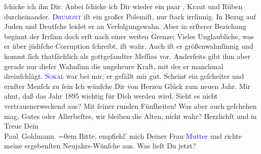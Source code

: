                ſchicke ich ihn Dir. Anbei ſchicke ich Dir wieder ein paar \label{K_mets_Goldmann_94-partII-55v}\label{K_mets_Goldmann_94-partII-55h}, Kraut und Rüben durcheinander. \textsc{\textcolor{blue}{Drumont}{}\ledrightnote{\textcolor{blue}{Édouard Drumont}}} iſt ein großer {\pb}Polemiſt, nur ſtark irrſinnig. In Bezug auf Juden
               und Deutſche leidet er an Verfolgungswahn. Aber in erſterer Beziehung beginnt der
               Irrſinn doch erſt nach einer weiten Grenze; Vieles Unglaubliche, was er über jüdiſche
               Corruption ſchreibt, iſt wahr. Auch iſt er größenwahnſinnig und kommt ſich
               thatſächlich als gottgeſandter Meſſias vor. Anderſeits gibt ihm aber gerade nur
               dieſer Wahnſinn die ungeheure Kraft, mit der er manchmal dreinſchlägt.\pend
           \pstart
           {\pb}\textsc{\textcolor{blue}{Sokal}{}\ledrightnote{\textcolor{blue}{Clemens Sokal}}} war bei mir; er
               gefällt mir gut. Scheint ein geſcheiter und ernſter Menſch zu ſein{\dotsfour}\pend
           \pstart
           Ich wünſche Dir von Herzen Glück zum neuen Jahr. Mir ahnt, daß das Jahr
                  1895 wichtig für Dich werden wird. Sieht es nicht vertrauenerweckend
               aus? Mit ſeiner runden Fünfheiten!\pend
           \pstart
           Was aber auch geſchehen mag, Gutes oder Allerbeſtes, wir bleiben die Alten, nicht
               wahr?\pend
           \pstart
           Herzlichſt und in Treue Dein{\\[\baselineskip]}\spacefill\mbox{Paul Goldmann\textcolor{gray}{.}}\pend
           \leftskip=0em{}\pstart
           \noindent{}{\pb}Bitte, empfiehl’ mich Deiner Frau \textcolor{blue}{Mutter}{} und richte \label{T_mets_Goldmann_94-partII-22v}\label{T_mets_Goldmann_94-partII-22h} meine ergebenſten Neujahrs-Wünſche aus.\pend
           \pstart
           Was lieſt Du jetzt?\pend
           \endnumbering{}  
      